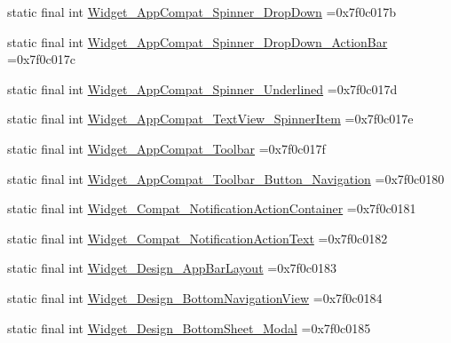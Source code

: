 \begin{DoxyCompactItemize}
\item 
static final int \mbox{\hyperlink{classbr_1_1unb_1_1cic_1_1mp_1_1marketmaster_1_1test_1_1R_1_1style_a46f7005c63a6230667edafbe4b4d3226}{Widget\+\_\+\+App\+Compat\+\_\+\+Spinner\+\_\+\+Drop\+Down}} =0x7f0c017b
\item 
static final int \mbox{\hyperlink{classbr_1_1unb_1_1cic_1_1mp_1_1marketmaster_1_1test_1_1R_1_1style_a769a0aa55c769a590822f599110fba6d}{Widget\+\_\+\+App\+Compat\+\_\+\+Spinner\+\_\+\+Drop\+Down\+\_\+\+Action\+Bar}} =0x7f0c017c
\item 
static final int \mbox{\hyperlink{classbr_1_1unb_1_1cic_1_1mp_1_1marketmaster_1_1test_1_1R_1_1style_add78abb0f11586e401f39754b353cb2d}{Widget\+\_\+\+App\+Compat\+\_\+\+Spinner\+\_\+\+Underlined}} =0x7f0c017d
\item 
static final int \mbox{\hyperlink{classbr_1_1unb_1_1cic_1_1mp_1_1marketmaster_1_1test_1_1R_1_1style_ade18bbcce2fc5d411da589c7c052ccdd}{Widget\+\_\+\+App\+Compat\+\_\+\+Text\+View\+\_\+\+Spinner\+Item}} =0x7f0c017e
\item 
static final int \mbox{\hyperlink{classbr_1_1unb_1_1cic_1_1mp_1_1marketmaster_1_1test_1_1R_1_1style_a1297fe60decd420f5466dbe0de8056cc}{Widget\+\_\+\+App\+Compat\+\_\+\+Toolbar}} =0x7f0c017f
\item 
static final int \mbox{\hyperlink{classbr_1_1unb_1_1cic_1_1mp_1_1marketmaster_1_1test_1_1R_1_1style_a4109a5f4e5e1cbe4378ca8704fc71d52}{Widget\+\_\+\+App\+Compat\+\_\+\+Toolbar\+\_\+\+Button\+\_\+\+Navigation}} =0x7f0c0180
\item 
static final int \mbox{\hyperlink{classbr_1_1unb_1_1cic_1_1mp_1_1marketmaster_1_1test_1_1R_1_1style_a8d3627e90b5f5369cd3861e306552d2b}{Widget\+\_\+\+Compat\+\_\+\+Notification\+Action\+Container}} =0x7f0c0181
\item 
static final int \mbox{\hyperlink{classbr_1_1unb_1_1cic_1_1mp_1_1marketmaster_1_1test_1_1R_1_1style_a8e1a65a0373535767710cffc6347d6ca}{Widget\+\_\+\+Compat\+\_\+\+Notification\+Action\+Text}} =0x7f0c0182
\item 
static final int \mbox{\hyperlink{classbr_1_1unb_1_1cic_1_1mp_1_1marketmaster_1_1test_1_1R_1_1style_a324ac2367f6d01aad8c3d4a52501ae12}{Widget\+\_\+\+Design\+\_\+\+App\+Bar\+Layout}} =0x7f0c0183
\item 
static final int \mbox{\hyperlink{classbr_1_1unb_1_1cic_1_1mp_1_1marketmaster_1_1test_1_1R_1_1style_a8aaf9ea0221f7b332f9d9fcbd9963bb7}{Widget\+\_\+\+Design\+\_\+\+Bottom\+Navigation\+View}} =0x7f0c0184
\item 
static final int \mbox{\hyperlink{classbr_1_1unb_1_1cic_1_1mp_1_1marketmaster_1_1test_1_1R_1_1style_afece5e86a3c30bfd3219f234e41399c8}{Widget\+\_\+\+Design\+\_\+\+Bottom\+Sheet\+\_\+\+Modal}} =0x7f0c0185

\end{DoxyCompactItemize}
